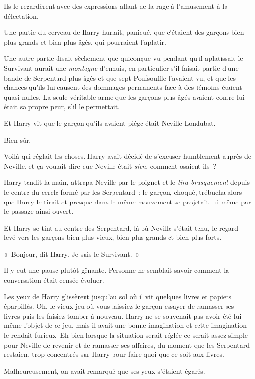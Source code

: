 Ils le regardèrent avec des expressions allant de la rage à l'amusement à la délectation.

Une partie du cerveau de Harry hurlait, paniqué, que c'étaient des garçons bien plus grands et bien plus âgés, qui pourraient l'aplatir.

Une autre partie disait sèchement que quiconque vu pendant qu'il aplatissait le Survivant aurait une \emph{montagne} d'ennuis, en particulier s'il faisait partie d'une bande de Serpentard plus âgés et que sept Poufsouffle l'avaient vu, et que les chances qu'ils lui causent des dommages permanents face à des témoins étaient quasi nulles. La seule véritable arme que les garçons plus âgés avaient contre lui était sa propre peur, s'il le permettait.

Et Harry vit que le garçon qu'ils avaient piégé était Neville Londubat.

Bien sûr.

Voilà qui réglait les choses. Harry avait décidé de s'excuser humblement auprès de Neville, et ça voulait dire que Neville était \emph{sien}, comment osaient-ils~?

Harry tendit la main, attrapa Neville par le poignet et le \emph{tira brusquement} depuis le centre du cercle formé par les Serpentard~; le garçon, choqué, trébucha alors que Harry le tirait et presque dans le même mouvement se projetait lui-même par le passage ainsi ouvert.

Et Harry se tint au centre des Serpentard, là où Neville s'était tenu, le regard levé vers les garçons bien plus vieux, bien plus grands et bien plus forts.

«~Bonjour, dit Harry. Je suis le Survivant.~»

Il y eut une pause plutôt gênante. Personne ne semblait savoir comment la conversation était censée évoluer.

Les yeux de Harry glissèrent jusqu'au sol où il vit quelques livres et papiers éparpillés. Oh, le vieux jeu où vous laissiez le garçon essayer de ramasser ses livres puis les faisiez tomber à nouveau. Harry ne se souvenait pas avoir été lui-même l'objet de ce jeu, mais il avait une bonne imagination et cette imagination le rendait furieux. Eh bien lorsque la situation serait réglée ce serait assez simple pour Neville de revenir et de ramasser ses affaires, du moment que les Serpentard restaient trop concentrés sur Harry pour faire quoi que ce soit aux livres.

Malheureusement, on avait remarqué que ses yeux s'étaient égarés.

